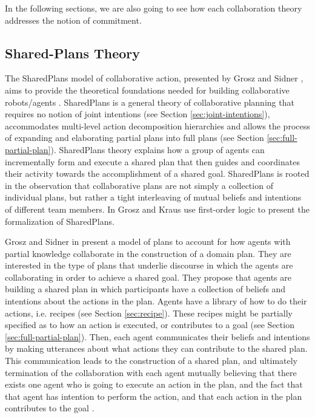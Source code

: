 \documentclass[12pt]{report}
\begin{document}
In the following sections, we are also going to see how each collaboration
theory addresses the notion of commitment.

\subsection{Shared-Plans Theory}
\label{sec:sharedplans}

The SharedPlans model of collaborative action, presented by Grosz and Sidner
\cite{grosz:planning-acting, grosz:collaboration, grosz:plans-discourse}, aims
to provide the theoretical foundations needed for building collaborative
robots/agents \cite{grosz:collaborative-systems}. SharedPlans is a general
theory of collaborative planning that requires no notion of joint intentions
(see Section \ref{sec:joint-intentions}), accommodates multi-level action
decomposition hierarchies and allows the process of expanding and elaborating
partial plans into full plans (see Section \ref{sec:full-partial-plan}).
SharedPlans theory explains how a group of agents can incrementally form and
execute a shared plan that then guides and coordinates their activity towards
the accomplishment of a shared goal. SharedPlans is rooted in the observation
that collaborative plans are not simply a collection of individual plans, but
rather a tight interleaving of mutual beliefs and intentions of different team
members. In \cite{grosz:collaboration} Grosz and Kraus use first-order logic to
present the formalization of SharedPlans.

Grosz and Sidner in \cite{grosz:plans-discourse} present a model of plans to
account for how agents with partial knowledge collaborate in the construction of
a domain plan. They are interested in the type of plans that underlie discourse
in which the agents are collaborating in order to achieve a shared goal. They
propose that agents are building a shared plan in which participants have a
collection of beliefs and intentions about the actions in the plan. Agents have
a library of how to do their actions, i.e. recipes (see Section
\ref{sec:recipe}). These recipes might be partially specified as to how an
action is executed, or contributes to a goal (see Section
\ref{sec:full-partial-plan}). Then, each agent communicates their beliefs and
intentions by making utterances about what actions they can contribute to the
shared plan. This communication leads to the construction of a shared plan, and
ultimately termination of the collaboration with each agent mutually believing
that there exists one agent who is going to execute an action in the plan, and
the fact that that agent has intention to perform the action, and that each
action in the plan contributes to the goal \cite{grosz:plans-discourse}
\cite{lochbaum:plan-models}.
\end{document}
